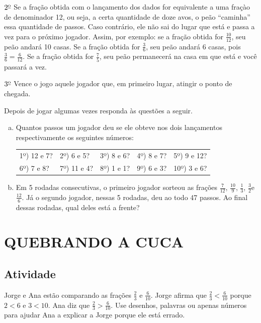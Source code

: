 $2^{\textrm{\underline{o}}}$ Se a fração obtida com o lançamento dos dados for equivalente a uma fraçào de denominador 12, ou seja, a certa quantidade de doze avos, o peão ``caminha'' essa quantidade de passos. Caso contrário, ele não sai do lugar que está e passa a vez para o próximo jogador. Assim, por exemplo: se a fração obtida for $\frac{10}{12}$, seu peão andará 10 casas. Se a fração obtida for $\frac{3}{6}$, seu peão andará $6$ casas, pois $\frac{3}{6} = \frac{6}{12}$. Se a fração obtida for $\frac{7}{5}$, seu peão permanecerá na casa em que está e você passará a vez.

$3^{\textrm{\underline{o}}}$ Vence o jogo aquele jogador que, em primeiro lugar, atingir o ponto de chegada. 

Depois de jogar algumas vezes responda às questões a seguir. 


\begin{enumerate}[a)]
 \item Quantos passos um jogador deu se ele obteve nos dois lançamentos respectivamente os seguintes números:

 \noindent \begin{tabular}{m{}m{}m{}m{}m{}}
1º) 12 e 7?  & 2º) 6 e 5? & 3º) 8 e 6? & 4º) 8 e 7? & 5º) 9 e 12? \\
6º) 7 e 8? & 7º) 11 e 4? & 8º) 1 e 1? & 9º) 6 e 3? & 10º) 3 e 6?
\end{tabular}

\item   Em 5 rodadas consecutivas, o primeiro jogador sorteou as frações  $\frac{7}{12}$, $\frac{10}{9}$, $\frac{1}{3}$, $\frac{3}{2}$e  $\frac{12}{6}$. Já o segundo jogador, nessas 5 rodadas, deu ao todo 47 passos. Ao final dessas rodadas, qual deles está a frente? 
\end{enumerate}


\section{QUEBRANDO A CUCA }


\subsection{Atividade}

Jorge e Ana estão comparando as frações $\frac{2}{3}$ e $\frac{6}{10}$. Jorge afirma que 
$\frac{2}{3} < \frac{6}{10}$ porque $2 < 6$ e $3 < 10$. Ana diz que $\frac{2}{3} > \frac{6}{10}$. Use desenhos, palavras ou apenas números para ajudar Ana a explicar a Jorge porque ele está errado.

